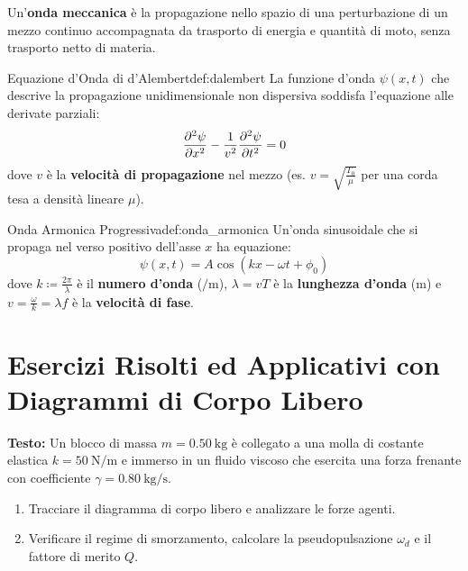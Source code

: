 Un'\textbf{onda meccanica} è la propagazione nello spazio di una perturbazione di un mezzo continuo accompagnata da trasporto di energia e quantità di moto, senza trasporto netto di materia.

\begin{definizione}{Equazione d'Onda di d'Alembert}{def:dalembert}
La funzione d'onda $\psi(x, t)$ che descrive la propagazione unidimensionale non dispersiva soddisfa l'equazione alle derivate parziali:
\begin{equation}
    \frac{\partial^2 \psi}{\partial x^2} - \frac{1}{v^2}\frac{\partial^2 \psi}{\partial t^2} = 0
    \label{eq:dalembert}
\end{equation}
dove $v$ è la \textbf{velocità di propagazione} nel mezzo (es. $v = \sqrt{\frac{T_0}{\mu}}$ per una corda tesa a densità lineare $\mu$).
\end{definizione}

\begin{definizione}{Onda Armonica Progressiva}{def:onda_armonica}
Un'onda sinusoidale che si propaga nel verso positivo dell'asse $x$ ha equazione:
\begin{equation}
    \psi(x, t) = A \cos(kx - \omega t + \phi_0)
    \label{eq:onda_armonica}
\end{equation}
dove $k \coloneqq \frac{2\pi}{\lambda}$ è il \textbf{numero d'onda} ($\si{\per\metre}$), $\lambda = v T$ è la \textbf{lunghezza d'onda} ($\si{\metre}$) e $v = \frac{\omega}{k} = \lambda f$ è la \textbf{velocità di fase}.
\end{definizione}

\section{Esercizi Risolti ed Applicativi con Diagrammi di Corpo Libero}
\label{sec:esercizi_oscillazioni}

\begin{esercizio}
\textbf{Testo:}
Un blocco di massa $m = \SI{0.50}{\kilogram}$ è collegato a una molla di costante elastica $k = \SI{50}{\newton\per\metre}$ e immerso in un fluido viscoso che esercita una forza frenante con coefficiente $\gamma = \SI{0.80}{\kilogram\per\second}$.
\begin{enumerate}
    \item Tracciare il diagramma di corpo libero e analizzare le forze agenti.
    \item Verificare il regime di smorzamento, calcolare la pseudopulsazione $\omega_d$ e il fattore di merito $Q$.
\end{enumerate}
\end{esercizio}

